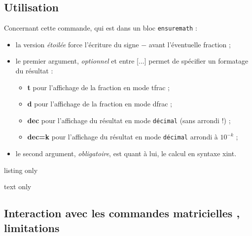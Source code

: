\documentclass[a4paper,11pt]{article}
\newcommand\Cle[1]{{\bfseries\sffamily\textlangle #1\textrangle}}
\begin{document}
\subsection{Utilisation}

Concernant cette commande, qui est dans un bloc \texttt{ensuremath} :

\begin{itemize}
	\item la version \textit{étoilée} force l'écriture du signe \og $-$ \fg{} avant l'éventuelle fraction ;
	\item le premier argument, \textit{optionnel} et entre \textsf{[...]} permet de spécifier un formatage du résultat :
	\begin{itemize}
		\item \Cle{t} pour l'affichage de la fraction en mode \textsf{tfrac} ;
		\item \Cle{d} pour l'affichage de la fraction en mode \textsf{dfrac} ;
		\item \Cle{dec} pour l'affichage du résultat en mode \texttt{décimal} (sans arrondi !) ;
		\item \Cle{dec=k} pour l'affichage du résultat en mode \texttt{décimal} arrondi à $10^{-k}$ ;
	\end{itemize}
	\item le second argument, \textit{obligatoire}, est quant à lui, le calcul en syntaxe \textsf{xint}.
\end{itemize}

\begin{PresentationCode}{listing only}




\end{PresentationCode}

\begin{PresentationCode}{text only}
\hfill{} \qquad
{} \qquad
{} \qquad
{} \qquad
{}\hfill~
\end{PresentationCode}

\subsection{Interaction avec les commandes \og matricielles \fg, limitations}
\end{document}
